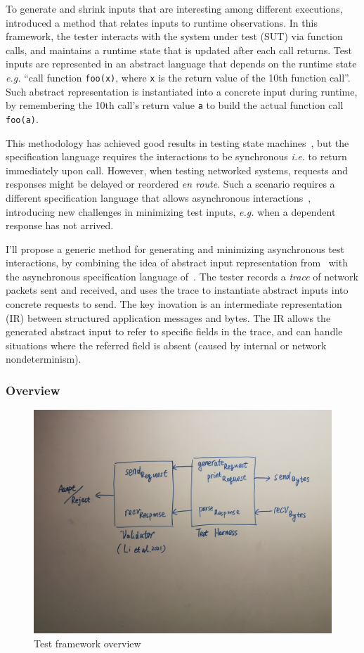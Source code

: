 \documentclass{article}
\newcommand{\ilc}[1]{\lstinline[style=customcoq]{#1}}
\theoremstyle{definition}
\begin{document}
To generate and shrink inputs that are interesting among different executions,
\textcite{Hughes2007} introduced a method that relates inputs to runtime
observations.  In this framework, the tester interacts with the system under
test (SUT) via function calls, and maintains a runtime state that is updated
after each call returns.  Test inputs are represented in an abstract language
that depends on the runtime state {\it e.g.} ``call function \ilc{foo(x)}, where
\ilc{x} is the return value of the 10th function call''.  Such abstract
representation is instantiated into a concrete input during runtime, by
remembering the 10th call's return value \ilc{a} to build the actual function
call \ilc{foo(a)}.

This methodology has achieved good results in testing state
machines~\cite{Hughes2016}, but the specification language requires the
interactions to be synchronous {\it i.e.} to return immediately upon call.
However, when testing networked systems, requests and responses might be delayed
or reordered \textit{en route}.  Such a scenario requires a different
specification language that allows asynchronous
interactions~\cite{issta21}, introducing new challenges in minimizing
test inputs, {\it e.g.} when a dependent response has not arrived.

I'll propose a generic method for generating and minimizing asynchronous test
interactions, by combining the idea of abstract input representation
from~\textcite{Hughes2007} with the asynchronous specification language
of~\textcite{issta21}.  The tester records a {\em trace} of network
packets sent and received, and uses the trace to instantiate abstract inputs
into concrete requests to send.  The key inovation is an intermediate
representation (IR) between structured application messages and bytes.  The IR
allows the generated abstract input to refer to specific fields in the trace,
and can handle situations where the referred field is absent (caused by internal
or network nondeterminism).

\subsubsection{Overview}
\begin{figure}
  \centering
  \includegraphics[width=.9\textwidth]{figures/overview}
  \caption{Test framework overview}
  \label{fig:overview}
\end{figure}
\end{document}
